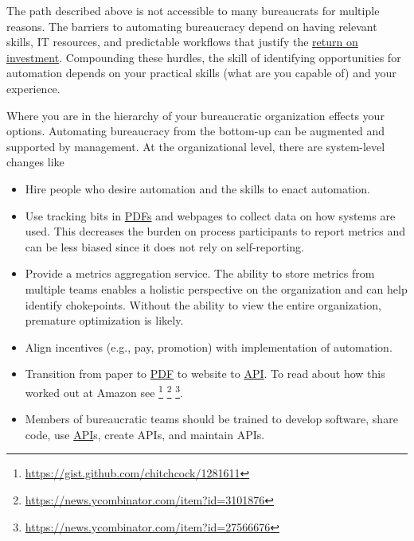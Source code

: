The path described above is not accessible to many bureaucrats for multiple reasons. 
The barriers to automating bureaucracy depend on having relevant skills, IT resources, and predictable workflows that justify the
\href{https://en.wikipedia.org/wiki/Return_on_investment}{return on investment}. Compounding these hurdles, the skill of identifying opportunities for automation depends on your practical skills (what are you capable of) and your experience.

Where you are in the hierarchy of your bureaucratic organization effects your options. 
Automating bureaucracy from the bottom-up can be augmented and supported by management. 
At the organizational level, there are system-level changes like
\begin{itemize}
    \item Hire people who desire automation and the skills to enact automation.
    \item Use tracking bits in
    \href{https://en.wikipedia.org/wiki/PDF}{PDFs} and webpages to collect data on how systems are used. This decreases the burden on process participants to report metrics and can be less biased since it does not rely on self-reporting.
    \item Provide a metrics aggregation service. The ability to store metrics from multiple teams enables a holistic perspective on the organization and can help identify chokepoints. Without the ability to view the entire organization, premature optimization is likely.
    \item Align incentives (e.g., pay, promotion) with implementation of automation.
    \item Transition from paper to 
    \href{https://en.wikipedia.org/wiki/PDF}{PDF} 
    to website to \href{https://en.wikipedia.org/wiki/API}{API}. 
    To read about how this worked out at Amazon see \footnote{\href{https://gist.github.com/chitchcock/1281611}{https://gist.github.com/chitchcock/1281611}}
    \footnote{\href{https://news.ycombinator.com/item?id=3101876}{https://news.ycombinator.com/item?id=3101876}}
    \footnote{\href{https://news.ycombinator.com/item?id=27566676}{https://news.ycombinator.com/item?id=27566676}}.
    \item Members of bureaucratic teams should be trained to develop software, share code, use \href{https://en.wikipedia.org/wiki/API}{API}s, 
    create APIs, and maintain APIs.
\end{itemize}


